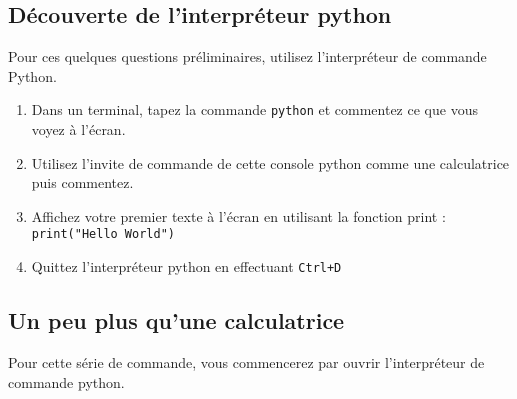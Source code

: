 
\subsection{Découverte de l'interpréteur python}

Pour ces quelques questions  préliminaires, utilisez l'interpréteur de
commande Python.

\begin{enumerate}

\item Dans un terminal, tapez la commande \texttt{python} et commentez
  ce que vous voyez à l'écran.

\item Utilisez l'invite de commande  de cette console python comme une
  calculatrice puis commentez.

\item Affichez votre premier texte  à l'écran en utilisant la fonction
  print : \\ \texttt{print("Hello World")}

\item Quittez l'interpréteur python en effectuant \texttt{Ctrl+D}

\end{enumerate}


\subsection{Un peu plus qu'une calculatrice}

Pour   cette  série   de   commande,  vous   commencerez  par   ouvrir
l'interpréteur de commande python.


